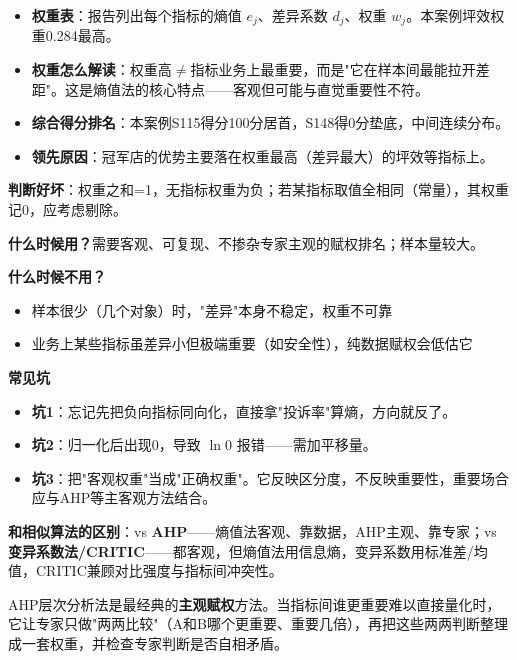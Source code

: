 \begin{algoresult}
\begin{itemize}
    \item \textbf{权重表}：报告列出每个指标的熵值 $e_j$、差异系数 $d_j$、权重 $w_j$。本案例坪效权重0.284最高。
    \item \textbf{权重怎么解读}：权重高$\neq$指标业务上最重要，而是"它在样本间最能拉开差距"。这是熵值法的核心特点——客观但可能与直觉重要性不符。
    \item \textbf{综合得分排名}：本案例S115得分100分居首，S148得0分垫底，中间连续分布。
    \item \textbf{领先原因}：冠军店的优势主要落在权重最高（差异最大）的坪效等指标上。
\end{itemize}

\textbf{判断好坏}：权重之和=1，无指标权重为负；若某指标取值全相同（常量），其权重记0，应考虑剔除。
\end{algoresult}

\begin{algonotes}
\textbf{什么时候用？}需要客观、可复现、不掺杂专家主观的赋权排名；样本量较大。

\textbf{什么时候不用？}
\begin{itemize}
    \item 样本很少（几个对象）时，"差异"本身不稳定，权重不可靠
    \item 业务上某些指标虽差异小但极端重要（如安全性），纯数据赋权会低估它
\end{itemize}

\textbf{常见坑}
\begin{itemize}
    \item \textbf{坑1}：忘记先把负向指标同向化，直接拿"投诉率"算熵，方向就反了。
    \item \textbf{坑2}：归一化后出现0，导致 $\ln 0$ 报错——需加平移量。
    \item \textbf{坑3}：把"客观权重"当成"正确权重"。它反映区分度，不反映重要性，重要场合应与AHP等主客观方法结合。
\end{itemize}

\textbf{和相似算法的区别}：vs \textbf{AHP}——熵值法客观、靠数据，AHP主观、靠专家；vs \textbf{变异系数法/CRITIC}——都客观，但熵值法用信息熵，变异系数用标准差/均值，CRITIC兼顾对比强度与指标间冲突性。
\end{algonotes}


\begin{algointro}
AHP层次分析法是最经典的\textbf{主观赋权}方法。当指标间谁更重要难以直接量化时，它让专家只做"两两比较"（A和B哪个更重要、重要几倍），再把这些两两判断整理成一套权重，并检查专家判断是否自相矛盾。
\end{algointro}

